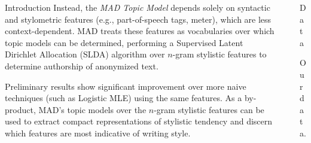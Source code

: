 \documentclass[final]{beamer}
\newlength{\sepwid}
\newlength{\onecolwid}
\newlength{\twocolwid}
\begin{document}
\begin{frame}[t]
\begin{columns}[t]
\begin{column}{\onecolwid}
\begin{block}{Introduction}
Instead, the \textit{MAD Topic Model} depends solely on syntactic and stylometric features (e.g., part-of-speech tags, meter), which are less context-dependent. MAD treats these features as vocabularies over which topic models can be determined, performing a Supervised Latent Dirichlet Allocation (SLDA) algorithm over $n$-gram stylistic features to determine authorship of anonymized text.

Preliminary results show significant improvement over more naive techniques (such as Logistic MLE) using the same features. As a by-product, MAD's topic models over the $n$-gram stylistic features can be used to extract compact representations of stylistic tendency and discern which features are most indicative of writing style.

\end{block}




\end{column} %

\begin{column}{\sepwid}\end{column} %

\begin{column}{\twocolwid} %

\begin{columns}[t,totalwidth=\twocolwid] %

\begin{column}{\onecolwid}\vspace{-.6in} %


\begin{block}{Data}

Our data.

\end{block}


\end{column} %


\end{columns}
\end{column}
\end{columns}
\end{frame}
\end{document}
